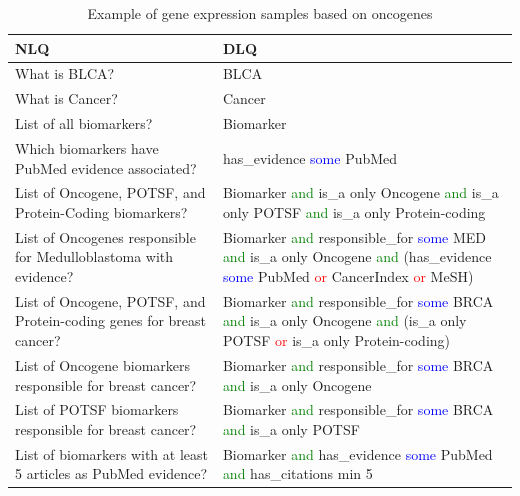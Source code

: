 \begin{table}
    \caption{Example of gene expression samples based on oncogenes}
    \label{table:nlq_dlq}
    \vspace{-4mm}
    \begin{center}
        \scriptsize
        \begin{tabular}{l|l}
            \hline
            \rowcolor{Gray}
            \textbf{NLQ} & \textbf{DLQ} \\\hline  
                What is BLCA? & BLCA \\\hline
                What is Cancer? & Cancer \\\hline
                List of all biomarkers? & Biomarker \\\hline
                Which biomarkers have PubMed evidence associated? & has\_evidence \textcolor{blue}{some} PubMed \\\hline
                List of Oncogene, POTSF, and Protein-Coding biomarkers? & Biomarker \textcolor{green}{and} is\_a only Oncogene \textcolor{green}{and} is\_a only POTSF \textcolor{green}{and} is\_a only Protein-coding \\\hline
                List of Oncogenes responsible for Medulloblastoma with evidence? & Biomarker \textcolor{green}{and} responsible\_for \textcolor{blue}{some} MED \textcolor{green}{and} is\_a only Oncogene \textcolor{green}{and} (has\_evidence \textcolor{blue}{some} PubMed \textcolor{red}{or} CancerIndex \textcolor{red}{or}  MeSH) \\\hline
                List of Oncogene, POTSF, and Protein-coding genes for breast cancer? & Biomarker \textcolor{green}{and} responsible\_for \textcolor{blue}{some} BRCA \textcolor{green}{and} is\_a only Oncogene \textcolor{green}{and} (is\_a only POTSF \textcolor{red}{or} is\_a only Protein-coding) \\\hline              
                List of Oncogene biomarkers responsible for breast cancer? & Biomarker \textcolor{green}{and} responsible\_for \textcolor{blue}{some} BRCA \textcolor{green}{and} is\_a only Oncogene \\\hline
                List of POTSF biomarkers responsible for breast cancer? & Biomarker \textcolor{green}{and} responsible\_for \textcolor{blue}{some} BRCA \textcolor{green}{and} is\_a only POTSF \\\hline
                List of biomarkers with at least 5 articles as PubMed evidence? & Biomarker \textcolor{green}{and} has\_evidence \textcolor{blue}{some} PubMed \textcolor{green}{and} has\_citations min 5 \\\hline

\end{tabular}
\end{center}
\end{table}
